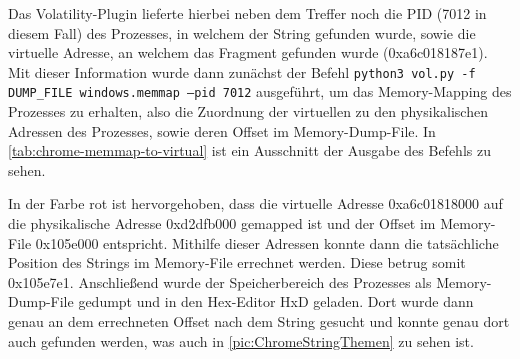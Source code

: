 Das Volatility-Plugin lieferte hierbei neben dem Treffer noch die PID (7012 in diesem Fall) des Prozesses, in welchem der String gefunden wurde, sowie die virtuelle Adresse, an welchem das Fragment gefunden wurde (0xa6c018187e1). Mit dieser Information wurde dann zunächst der Befehl \texttt{python3 vol.py -f DUMP\_FILE windows.memmap --pid 7012} ausgeführt, um das Memory-Mapping des Prozesses zu erhalten, also die Zuordnung der virtuellen zu den physikalischen Adressen des Prozesses, sowie deren Offset im Memory-Dump-File. In \autoref{tab:chrome-memmap-to-virtual} ist ein Ausschnitt der Ausgabe des Befehls zu sehen.

\begin{table}[h!]
	\centering
	\caption{Chrome: Abbildung virtueller Adressen auf Byte-Offsets der Speicherseite}
	\label{tab:chrome-memmap-to-virtual}
\end{table}

In der Farbe rot ist hervorgehoben, dass die virtuelle Adresse 0xa6c01818000 auf die physikalische Adresse 0xd2dfb000 gemapped ist und der Offset im Memory-File 0x105e000 entspricht. Mithilfe dieser Adressen konnte dann die tatsächliche Position des Strings im Memory-File errechnet werden. Diese betrug somit 0x105e7e1. Anschließend wurde der Speicherbereich des Prozesses als Memory-Dump-File gedumpt und in den Hex-Editor HxD geladen. Dort wurde dann genau an dem errechneten Offset nach dem String gesucht und konnte genau dort auch gefunden werden, was auch in \autoref{pic:ChromeStringThemen} zu sehen ist.

